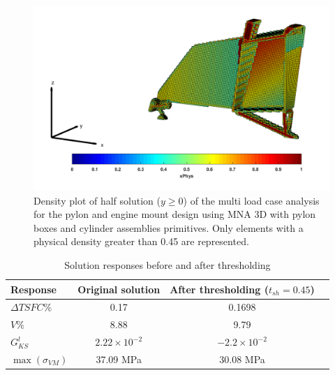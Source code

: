                             \begin{figure}[ht]
                             \centering
                             \includegraphics[width=\textwidth]{images/Ch3/pylon_Density_plot_143}
                             \caption{Density plot of half solution ($y\geq 0$) of the multi load case analysis for the pylon and engine mount design using MNA 3D with pylon boxes and cylinder assemblies primitives. Only elements with a physical density greater than 0.45 are represented.}
                             \label{fig.3.46}
                             \end{figure}
  \begin{table}[h]
                                                                       \caption{\label{tab:table7} Solution responses before and after thresholding }
                                                                        \centering
                                                                        \begin{tabular}{lccc}
                                                                        \hline
                                                                         Response& Original solution& After thresholding ($t_{sh}=0.45$) \\\hline
                                                                       $\Delta TSFC \%$ & 0.17 & 0.1698 \\
                                                                       $V \%$ & 8.88 & 9.79 \\
                                                                       $G_{KS}^l$ & $2.22\times 10^{-2}$ & $-2.2\times 10^{-2}$ \\
                                                                       $\max(\sigma_{VM})$ & 37.09 MPa & 30.08 MPa \\
                                                                        \hline
                                                                        \end{tabular}
                                                                        \end{table}
